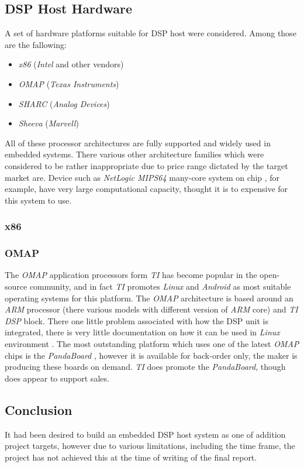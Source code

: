 

\subsection{DSP Host Hardware}

  A set of hardware platforms suitable for DSP host were considered.
 Among those are the fallowing:
 	\begin{itemize}
		\item \emph{x86} (\emph{Intel} and other vendors)
		\item \emph{OMAP} (\emph{Texas Instruments})
		\item \emph{SHARC} (\emph{Analog Devices})
		\item \emph{Sheeva} (\emph{Marvell})
	\end{itemize}
 All of these processor architectures are fully supported and widely
 used in embedded systems. There various other architecture families
 which were considered to be rather inappropriate due to price range
 dictated by the target market are. Device such as \emph{NetLogic
 MIPS64} many-core system on chip \cite{netlogic:mips64:multicore},
 for example, have very large computational capacity, thought it is
 to expensive for this system to use.

\subsubsection{x86}

\subsubsection{OMAP}

  The \emph{OMAP} application processors form \emph{TI} has become
 popular in the open-source community, and in fact \emph{TI} promotes
 \emph{Linux} and \emph{Android} as most suitable operating systems
 for this platform. The \emph{OMAP} architecture is based around
 an \emph{ARM} processor (there various models with different version
 of \emph{ARM} core) and \emph{TI DSP} block. There one little problem
 associated with how the DSP unit is integrated, there is very little
 documentation on how it can be used in \emph{Linux} environment
 \cite{ti:omap:wiki:dsp}. The most outstanding platform which uses
 one of the latest \emph{OMAP} chips is the \emph{PandaBoard}
 \cite{ti:omap:wiki:pb}, however it is available for back-order only,
 the maker is producing these boards on demand. \emph{TI} does
 promote the \emph{PandaBoard}, though does appear to support sales.


\subsection{Conclusion}

  It had been desired to build an embedded DSP host system as one of
 addition project targets, however due to various limitations, including
 the time frame, the project has not achieved this at the time of
 writing of the final report.

